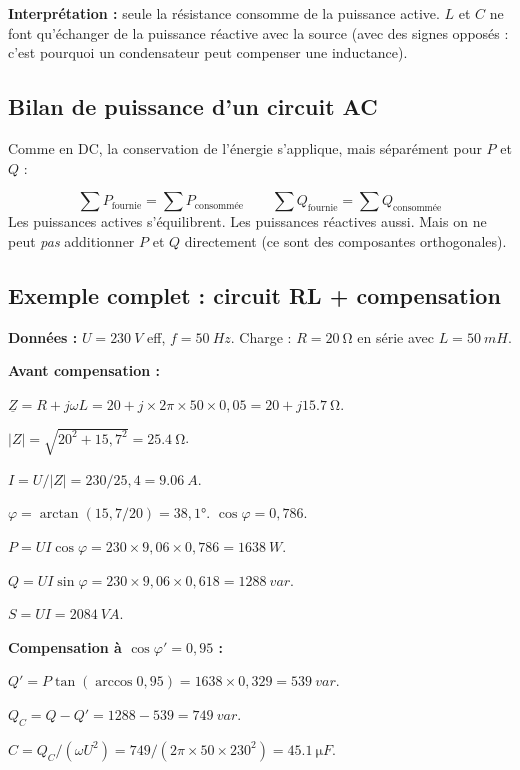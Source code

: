 \documentclass[12pt,a4paper,twoside]{book}
\begin{document}
\textbf{Interprétation :} seule la résistance consomme de la puissance active. $L$ et $C$ ne font qu'échanger de la puissance réactive avec la source (avec des signes opposés : c'est pourquoi un condensateur peut compenser une inductance).

\subsection{Bilan de puissance d'un circuit AC}

Comme en DC, la conservation de l'énergie s'applique, mais séparément pour $P$ et $Q$ :

\begin{formule}
\[
\boxed{\sum P_{\text{fournie}} = \sum P_{\text{consommée}}} \qquad \boxed{\sum Q_{\text{fournie}} = \sum Q_{\text{consommée}}}
\]
Les puissances actives s'équilibrent. Les puissances réactives aussi. Mais on ne peut \textit{pas} additionner $P$ et $Q$ directement (ce sont des composantes orthogonales).
\end{formule}

\subsection{Exemple complet : circuit RL + compensation}

\textbf{Données :} $U = \SI{230}{V}$ eff, $f = \SI{50}{Hz}$. Charge : $R = \SI{20}{\ohm}$ en série avec $L = \SI{50}{mH}$.

\textbf{Avant compensation :}

$\underline{Z} = R + j\omega L = 20 + j\times2\pi\times50\times0{,}05 = 20 + j\SI{15.7}{\ohm}$.

$|Z| = \sqrt{20^2 + 15{,}7^2} = \SI{25.4}{\ohm}$.

$I = U/|Z| = 230/25{,}4 = \SI{9.06}{A}$.

$\varphi = \arctan(15{,}7/20) = 38{,}1°$. $\cos\varphi = 0{,}786$.

$P = UI\cos\varphi = 230\times9{,}06\times0{,}786 = \SI{1638}{W}$.

$Q = UI\sin\varphi = 230\times9{,}06\times0{,}618 = \SI{1288}{var}$.

$S = UI = \SI{2084}{VA}$.

\textbf{Compensation à $\cos\varphi' = 0{,}95$ :}

$Q' = P\tan(\arccos 0{,}95) = 1638\times0{,}329 = \SI{539}{var}$.

$Q_C = Q - Q' = 1288 - 539 = \SI{749}{var}$.

$C = Q_C/(\omega U^2) = 749/(2\pi\times50\times230^2) = \SI{45.1}{\micro F}$.
\end{document}
